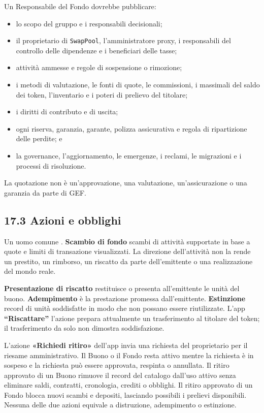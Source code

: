 \documentclass[11pt]{article}
\begin{document}
Un Responsabile del Fondo dovrebbe pubblicare:

\begin{itemize}[leftmargin=*]
\item lo scopo del gruppo e i responsabili decisionali;
\item il proprietario di \texttt{SwapPool}, l'amministratore proxy, i responsabili del controllo delle dipendenze e i beneficiari delle tasse;
\item attività ammesse e regole di sospensione o rimozione;
\item i metodi di valutazione, le fonti di quote, le commissioni, i massimali del saldo dei token, l'inventario e i poteri di prelievo del titolare;
\item i diritti di contributo e di uscita;
\item ogni riserva, garanzia, garante, polizza assicurativa e regola di ripartizione delle perdite; e
\item la governance, l'aggiornamento, le emergenze, i reclami, le migrazioni e i processi di risoluzione.
\end{itemize}
La quotazione non è un'approvazione, una valutazione, un'assicurazione o una garanzia da parte di GEF.

\subsection*{17.3 Azioni e obblighi}

Un uomo comune . \textbf{Scambio di fondo} scambi di attività supportate in base a quote e limiti di transazione visualizzati. La direzione dell'attività non la rende un prestito, un rimborso, un riscatto da parte dell'emittente o una realizzazione del mondo reale.

\textbf{Presentazione di riscatto } restituisce o presenta all'emittente le unità del buono. \textbf{ Adempimento } è la prestazione promessa dall'emittente. \textbf{ Estinzione } record di unità soddisfatte in modo che non possano essere riutilizzate. L'app \textbf{``Riscattare''} l'azione prepara attualmente un trasferimento al titolare del token; il trasferimento da solo non dimostra soddisfazione.

L'azione \textbf{«Richiedi ritiro»} dell'app invia una richiesta del proprietario per il riesame amministrativo. Il Buono o il Fondo resta attivo mentre la richiesta è in sospeso e la richiesta può essere approvata, respinta o annullata. Il ritiro approvato di un Buono rimuove il record del catalogo dall'uso attivo senza eliminare saldi, contratti, cronologia, crediti o obblighi. Il ritiro approvato di un Fondo blocca nuovi scambi e depositi, lasciando possibili i prelievi disponibili. Nessuna delle due azioni equivale a distruzione, adempimento o estinzione.
\end{document}
